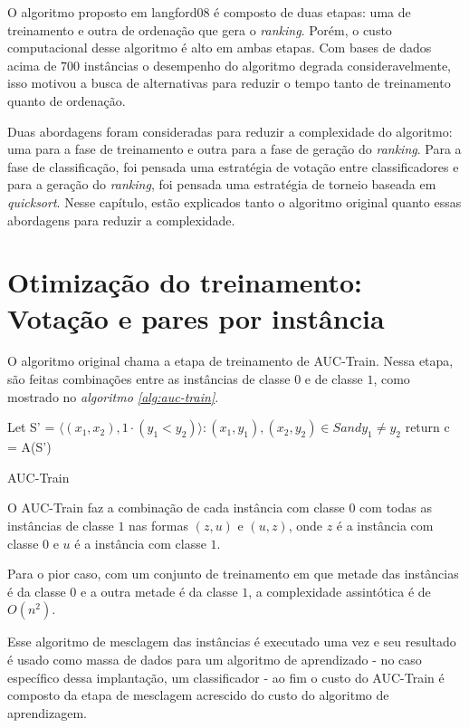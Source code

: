 O algoritmo proposto em {{langford08}} é composto de duas etapas: uma de treinamento e outra de ordenação que gera o \emph{ranking}. Porém, o custo computacional desse algoritmo é alto em ambas etapas. Com bases de dados acima de $700$ instâncias o desempenho do algoritmo degrada consideravelmente, isso motivou a busca de alternativas para reduzir o tempo tanto de treinamento quanto de ordenação.

Duas abordagens foram consideradas para reduzir a complexidade do algoritmo: uma para a fase de treinamento e outra para a fase de geração do \emph{ranking}. Para a fase de classificação, foi pensada uma estratégia de votação entre classificadores e para a geração do \emph{ranking}, foi pensada uma estratégia de torneio baseada em \emph{quicksort}. Nesse capítulo, estão explicados tanto o algoritmo original quanto essas abordagens para reduzir a complexidade.

\section{Otimização do treinamento: Votação e pares por instância}
O algoritmo original chama a etapa de treinamento de AUC-Train. Nessa etapa, são feitas combinações entre as instâncias de classe $0$ e de classe $1$, como mostrado no \emph{ algoritmo \ref{alg:auc-train}}. 

\begin{algorithm}
\begin{algorithmic}

\STATE Let S' = ${\langle(x_1, x_2), 1\cdot(y_1 < y_2)\rangle :(x_1, y_1), (x_2, y_2) \in S and y_1 \neq y_2}$
\STATE return c = A(S')

\caption{AUC-Train}
\label{alg:auc-train}

\end{algorithmic}
\end{algorithm}

O AUC-Train faz a combinação de cada instância com classe $0$ com todas as instâncias de classe $1$ nas formas $(z, u)$ e $(u, z)$, onde $z$ é a instância com classe $0$ e $u$ é a instância com classe $1$.

Para o pior caso, com um conjunto de treinamento em que metade das instâncias é da classe $0$ e a outra metade é da classe $1$, a complexidade assintótica é de $O(n^2)$.

Esse algoritmo de mesclagem das instâncias é executado uma vez e seu resultado é usado como massa de dados para um algoritmo de aprendizado - no caso específico dessa implantação, um classificador - ao fim o custo do AUC-Train é composto da etapa de mesclagem acrescido do custo do algoritmo de aprendizagem.

